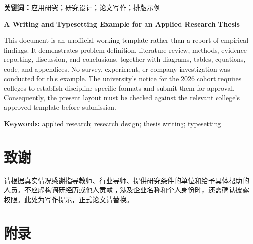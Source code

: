 \documentclass[12pt,a4paper,fontset=none]{ctexart}
\newcommand{\thesistitleeng}{A Writing and Typesetting Example for an Applied Research Thesis}
\begin{document}
\par\medskip\noindent\textbf{关键词：}应用研究；研究设计；论文写作；排版示例
\clearpage{}
\begin{center}{\bfseries{}\thesistitleeng}\par{}\end{center}
This document is an unofficial working template rather than a report of empirical findings. It demonstrates problem definition, literature review, methods, evidence reporting, discussion, and conclusions, together with diagrams, tables, equations, code, and appendices. No survey, experiment, or company investigation was conducted for this example. The university's notice for the 2026 cohort requires colleges to establish discipline-specific formats and submit them for approval. Consequently, the present layout must be checked against the relevant college's approved template before submission.
\par\medskip\noindent\textbf{Keywords:} applied research; research design; thesis writing; typesetting
\clearpage\tableofcontents
\clearpage{}

\clearpage\begingroup
\renewcommand{\bibsection}{\section*{参考文献}\addcontentsline{toc}{section}{参考文献}}
\renewcommand{\bibfont}{\songti\zihao{5}\setstretch{1}}

\endgroup
\clearpage\section*{致\quad 谢}
请根据真实情况感谢指导教师、行业导师、提供研究条件的单位和给予具体帮助的人员。不应虚构调研经历或他人贡献；涉及企业名称和个人身份时，还需确认披露权限。此处为写作提示，正式论文请替换。
\clearpage\section*{附\quad 录}

\end{document}
